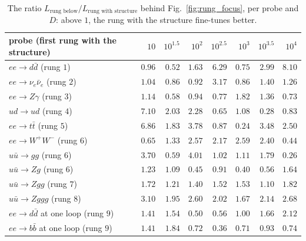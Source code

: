 \documentclass[11pt]{article}
\begin{document}
\begin{table}[H]
\centering
\caption{The ratio $L_{\text{rung below}}/L_{\text{rung with structure}}$ behind Fig.~\ref{fig:rung_focus}, per probe
and $D$: above $1$, the rung with the structure fine-tunes better.}
\label{tab:rung_focus_ratio}
\small
\begin{tabular}{@{}lrrrrrrr@{}}
\toprule
probe (first rung with the structure) & $10$ & $10^{1.5}$ & $10^2$ & $10^{2.5}$ & $10^3$ & $10^{3.5}$ & $10^4$ \\
\midrule
$ee\to d\bar d$ (rung $1$) & $0.96$ & $0.52$ & $1.63$ & $6.29$ & $0.75$ & $2.99$ & $8.10$ \\
$ee\to\nu_e\bar\nu_e$ (rung $2$) & $1.04$ & $0.86$ & $0.92$ & $3.17$ & $0.86$ & $1.40$ & $1.26$ \\
$ee\to Z\gamma$ (rung $3$) & $1.14$ & $0.58$ & $0.94$ & $0.77$ & $1.82$ & $1.36$ & $0.73$ \\
$ud\to ud$ (rung $4$) & $7.10$ & $2.03$ & $2.28$ & $0.65$ & $1.08$ & $0.28$ & $0.83$ \\
$ee\to t\bar t$ (rung $5$) & $6.86$ & $1.83$ & $3.78$ & $0.87$ & $0.24$ & $3.48$ & $2.50$ \\
$ee\to W^+W^-$ (rung $6$) & $0.65$ & $1.33$ & $2.57$ & $2.17$ & $2.59$ & $2.40$ & $0.44$ \\
$u\bar u\to gg$ (rung $6$) & $3.70$ & $0.59$ & $4.01$ & $1.02$ & $1.11$ & $1.79$ & $0.26$ \\
$u\bar u\to Zg$ (rung $6$) & $1.23$ & $1.09$ & $0.45$ & $0.91$ & $0.40$ & $0.56$ & $1.64$ \\
$u\bar u\to Zgg$ (rung $7$) & $1.72$ & $1.21$ & $1.40$ & $1.52$ & $1.53$ & $1.10$ & $1.82$ \\
$u\bar u\to Zggg$ (rung $8$) & $3.10$ & $1.95$ & $2.60$ & $2.02$ & $1.67$ & $2.14$ & $2.68$ \\
$ee\to d\bar d$ at one loop (rung $9$) & $1.41$ & $1.54$ & $0.50$ & $0.56$ & $1.00$ & $1.66$ & $2.12$ \\
$ee\to b\bar b$ at one loop (rung $9$) & $1.41$ & $1.84$ & $0.72$ & $0.36$ & $0.71$ & $0.93$ & $0.74$ \\
\bottomrule
\end{tabular}
\end{table}
\end{document}
